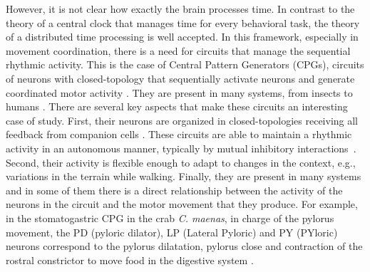 However, it is not clear how exactly the brain processes time. In contrast to the theory of a central clock that manages time for every behavioral task, the theory of a distributed time processing \parencite{buonomano_temporal_1995,ivry_representation_1996} is well accepted. In this framework, especially in movement coordination, there is a need for circuits that manage the sequential rhythmic activity. This is the case of Central Pattern Generators (CPGs), circuits of neurons with closed-topology that sequentially activate neurons and generate coordinated motor activity \parencite{selverston_reliable_2000}. They are present in many systems, from insects to humans \parencite{pearson_central_1972,marder_central_2001,mackay-lyons_central_2002,minassian_human_2017}. There are several key aspects that make these circuits an interesting case of study. First, their neurons are organized in closed-topologies receiving all feedback from companion cells \parencite{huerta_topology_2001}. These circuits are able to maintain a rhythmic activity in an autonomous manner, typically by mutual inhibitory interactions~\parencite{katz_evolution_nodate}. Second, their activity is flexible enough to adapt to changes in the context, e.g., variations in the terrain while walking. Finally, they are present in many systems and in some of them there is a direct relationship between the activity of the neurons in the circuit and the motor movement that they produce. For example, in the stomatogastric CPG in the crab \textit{C. maenas}, in charge of the pylorus movement, the PD (pyloric dilator), LP (Lateral Pyloric) and PY (PYloric) neurons correspond to the pylorus dilatation, pylorus close and contraction of the rostral constrictor to move food in the digestive system \parencite{moulins_introduction_1987,selverston_oscillations_2006}.

